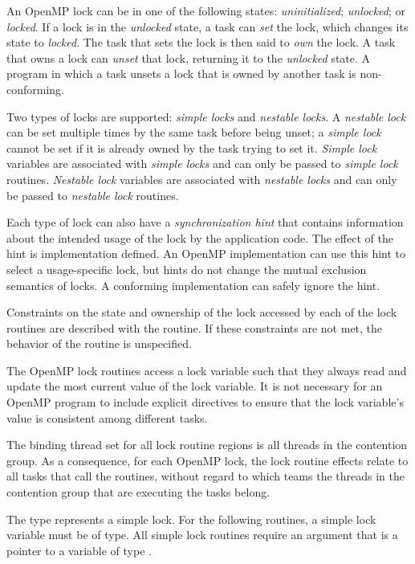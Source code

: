 An OpenMP lock can be in one of the following states: \emph{uninitialized}; 
\emph{unlocked}; or \emph{locked}. If a lock is in the \emph{unlocked} state, 
a task can \emph{set} the lock, which changes its state to \emph{locked}. 
The task that sets the lock is then said to \emph{own} the lock. A task 
that owns a lock can \emph{unset} that lock, returning it to the 
\emph{unlocked} state. A program in which a task unsets a lock that is 
owned by another task is non-conforming.

Two types of locks are supported: \emph{simple locks} and \emph{nestable locks}. 
A \emph{nestable lock} can be set multiple times by the same task before being 
unset; a \emph{simple lock} cannot be set if it is already owned by the task 
trying to set it. \emph{Simple lock} variables are associated with 
\emph{simple locks} and can only be passed to \emph{simple lock} routines. 
\emph{Nestable lock} variables are associated with \emph{nestable locks} and 
can only be passed to \emph{nestable lock} routines.

Each type of lock can also have a \emph{synchronization hint} that contains 
information about the intended usage of the lock by the application code.  
The effect of the hint is implementation defined.  An OpenMP implementation 
can use this hint to select a usage-specific lock, but hints do not change 
the mutual exclusion semantics of locks. A conforming implementation can 
safely ignore the hint.

Constraints on the state and ownership of the lock accessed by each of the 
lock routines are described with the routine. If these constraints are not 
met, the behavior of the routine is unspecified.

The OpenMP lock routines access a lock variable such that they always read
and update the most current value of the lock variable. It is not necessary 
for an OpenMP program to include explicit  directives to ensure 
that the lock variable's value is consistent among different tasks.

\binding
The binding thread set for all lock routine regions is all threads in the 
contention group. As a consequence, for each OpenMP lock, the lock routine 
effects relate to all tasks that call the routines, without regard to which 
teams the threads in the contention group that are executing the tasks belong.



\begin{ccppspecific}
The type  represents a simple lock. For the
following routines, a simple lock variable must be of  type. All simple
lock routines require an argument that is a pointer to a variable of type .
\end{ccppspecific}


